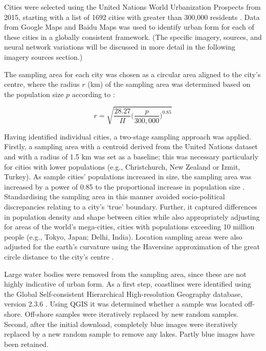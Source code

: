 \documentclass[10pt,letterpaper]{article}
\begin{document}
Cities were selected using the United Nations World Urbanization Prospects from 2015, starting with a list of 1692 cities with greater than 300,000 residents \cite{UN2014}. Data from Google Maps and Baidu Maps was used to identify urban form for each of these cities in a globally consistent framework. (The specific imagery, sources, and neural network variations will be discussed in more detail in the following imagery sources section.)

The sampling area for each city was chosen as a circular area aligned to the city's centre, where the radius $r$ (km) of the sampling area was determined based on the population size $p$ according to \cite{Barthelemy2016}: %

\begin{equation}
r = \sqrt{ \frac{28.27}{\Pi} \bigg( \frac{p}{300,000}  \bigg)^{0.85} }
\end{equation}

Having identified individual cities, a two-stage sampling approach was applied. Firstly, a sampling area with a centroid derived from the United Nations dataset and with a radius of 1.5 km was set as a baseline; this was necessary particularly for cities with lower populations (e.g., Christchurch, New Zealand or Izmit, Turkey). As sample cities' populations increased in size, the sampling area was increased by a power of 0.85 to the proportional increase in population size \cite{Barthelemy2016}. Standardising the sampling area in this manner avoided socio-political discrepancies relating to a city's `true' boundary. Further, it captured differences in population density and shape between cities while also appropriately adjusting for areas of the world's mega-cities, cities with populations exceeding 10 million people (e.g., Tokyo, Japan;  Delhi, India). Location sampling areas were also adjusted for the earth's curvature using the Haversine approximation of the great circle distance to the city's centre \cite{Sinnott1984}. 

Large water bodies were removed from the sampling area, since these are not highly indicative of urban form. As a first step, coastlines were identified using the Global Self-consistent Hierarchical High-resolution Geography database, version 2.3.6 \cite{Wessel1996}. Using QGIS \cite{QGIS2009} it was determined whether a sample was located off-shore. Off-shore samples were iteratively replaced by new random samples. Second, after the initial download, completely blue images were iteratively replaced by a new random sample to remove any lakes. Partly blue images have been retained.
\end{document}
